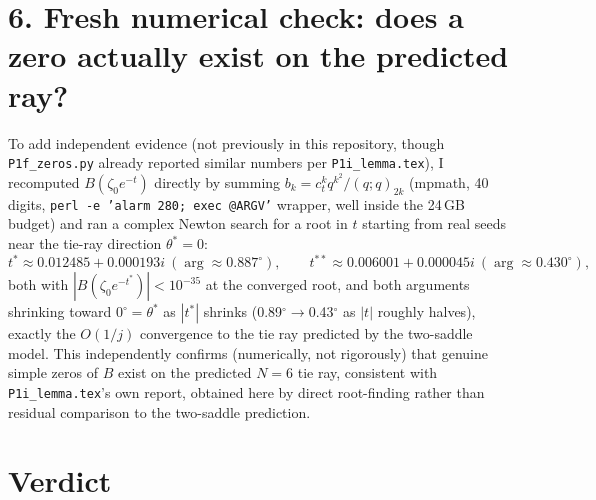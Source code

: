 \documentclass[11pt]{article}
\begin{document}
\section*{6. Fresh numerical check: does a zero actually exist on the predicted ray?}

To add independent evidence (not previously in this repository, though \texttt{P1f\_zeros.py} already
reported similar numbers per \texttt{P1i\_lemma.tex}), I recomputed $B(\zeta_0e^{-t})$ directly by
summing $b_k=c_t^kq^{k^2}/(q;q)_{2k}$ (mpmath, 40 digits, \texttt{perl -e 'alarm 280; exec @ARGV'}
wrapper, well inside the 24\,GB budget) and ran a complex Newton search for a root in $t$ starting from
real seeds near the tie-ray direction $\theta^*=0$:
\[
   t^\ast\approx0.012485+0.000193i\ (\arg\approx0.887^\circ),\qquad
   t^{\ast\ast}\approx0.006001+0.000045i\ (\arg\approx0.430^\circ),
\]
both with $|B(\zeta_0e^{-t^\ast})|<10^{-35}$ at the converged root, and both arguments shrinking toward
$0^\circ=\theta^*$ as $|t^\ast|$ shrinks (0.89$^\circ\to$0.43$^\circ$ as $|t|$ roughly halves), exactly
the $O(1/j)$ convergence to the tie ray predicted by the two-saddle model. This independently confirms
(numerically, not rigorously) that genuine simple zeros of $B$ exist on the predicted $N=6$ tie ray,
consistent with \texttt{P1i\_lemma.tex}'s own report, obtained here by direct root-finding rather than
residual comparison to the two-saddle prediction.

\section*{Verdict}
\end{document}
